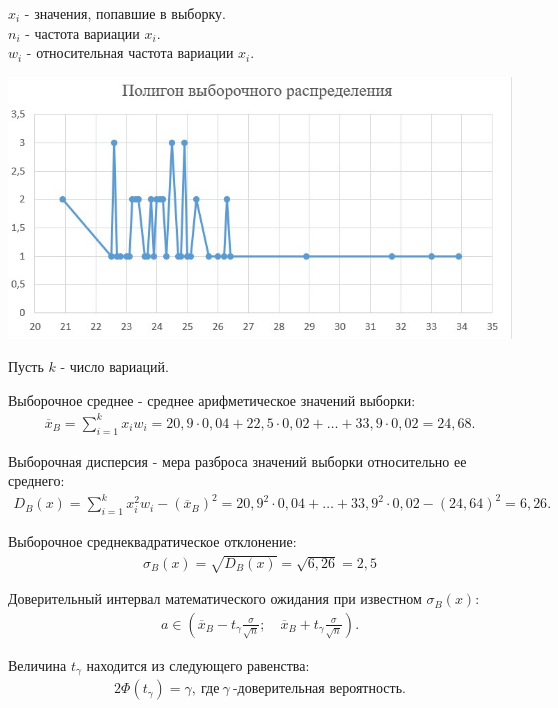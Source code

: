 \documentclass[utf8, a4paper, 14pt, russian, oneside]{book}
\begin{document}
$x_i$ - значения, попавшие в выборку.\\
$n_i$ - частота вариации $x_i$.\\
$w_i$ - относительная частота вариации $x_i$.

{
\centering
\includegraphics[scale=0.85]{img/poligon.jpg}
}

Пусть $k$ - число вариаций.

Выборочное среднее - среднее арифметическое значений выборки:
\begin{align*}
    \overline{x}_B = \sum\limits_{i=1}^{k}x_i w_i = 20,9 \cdot 0,04 + 22,5 \cdot 0,02 + \ldots + 33,9 \cdot 0,02 = 24,68.
\end{align*}

Выборочная дисперсия - мера разброса значений выборки относительно ее среднего:
\begin{align*}
    D_B(x) = \sum\limits_{i=1}^{k}x_i^2w_i - (\overline{x}_B)^2 = 20,9^2 \cdot 0,04 + \ldots + 33,9^2 \cdot 0,02 - (24,64)^2 = 6,26.
\end{align*}

Выборочное среднеквадратическое отклонение:
\begin{align*}
    \sigma_B(x) = \sqrt{{D_B(x)}} = \sqrt{6,26} = 2,5
\end{align*}
\newpage

Доверительный интервал математического ожидания при известном $\sigma_B(x)$:
\begin{align*}
    a \in \left( \overline{x}_B - t_{\gamma}\frac{\sigma}{\sqrt{n}}; \quad \overline{x}_B + t_{\gamma}\frac{\sigma}{\sqrt{n}} \right).
\end{align*}

Величина $t_{\gamma}$ находится из следующего равенства:
\begin{align*}
    2\Phi(t_\gamma) = \gamma,\  \text{где}\  \gamma\ \text{-доверительная вероятность.}
\end{align*}
\end{document}

